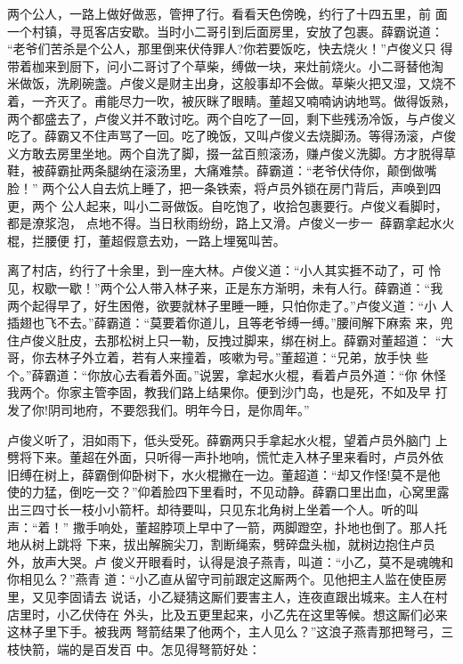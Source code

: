 两个公人，一路上做好做恶，管押了行。看看天色傍晚，约行了十四五里，前
面一个村镇，寻觅客店安歇。当时小二哥引到后面房里，安放了包裹。薛霸说道：
“老爷们苦杀是个公人，那里倒来伏侍罪人?你若要饭吃，快去烧火！”卢俊义只
得带着枷来到厨下，问小二哥讨了个草柴，缚做一块，来灶前烧火。小二哥替他淘
米做饭，洗刷碗盏。卢俊义是财主出身，这般事却不会做。草柴火把又湿，又烧不
着，一齐灭了。甫能尽力一吹，被灰眯了眼睛。董超又喃喃讷讷地骂。做得饭熟，
两个都盛去了，卢俊义并不敢讨吃。两个自吃了一回，剩下些残汤冷饭，与卢俊义
吃了。薛霸又不住声骂了一回。吃了晚饭，又叫卢俊义去烧脚汤。等得汤滚，卢俊
义方敢去房里坐地。两个自洗了脚，掇一盆百煎滚汤，赚卢俊义洗脚。方才脱得草
鞋，被薛霸扯两条腿纳在滚汤里，大痛难禁。薛霸道：“老爷伏侍你，颠倒做嘴脸！”
两个公人自去炕上睡了，把一条铁索，将卢员外锁在房门背后，声唤到四更，两个
公人起来，叫小二哥做饭。自吃饱了，收拾包裹要行。卢俊义看脚时，都是潦浆泡，
点地不得。当日秋雨纷纷，路上又滑。卢俊义一步一，薛霸拿起水火棍，拦腰便
打，董超假意去劝，一路上埋冤叫苦。

离了村店，约行了十余里，到一座大林。卢俊义道：“小人其实捱不动了，可
怜见，权歇一歇！”两个公人带入林子来，正是东方渐明，未有人行。薛霸道：“我
两个起得早了，好生困倦，欲要就林子里睡一睡，只怕你走了。”卢俊义道：“小
人插翅也飞不去。”薛霸道：“莫要着你道儿，且等老爷缚一缚。”腰间解下麻索
来，兜住卢俊义肚皮，去那松树上只一勒，反拽过脚来，绑在树上。薛霸对董超道：
“大哥，你去林子外立着，若有人来撞着，咳嗽为号。”董超道：“兄弟，放手快
些个。”薛霸道：“你放心去看着外面。”说罢，拿起水火棍，看着卢员外道：“你
休怪我两个。你家主管李固，教我们路上结果你。便到沙门岛，也是死，不如及早
打发了你!阴司地府，不要怨我们。明年今日，是你周年。”

卢俊义听了，泪如雨下，低头受死。薛霸两只手拿起水火棍，望着卢员外脑门
上劈将下来。董超在外面，只听得一声扑地响，慌忙走入林子里来看时，卢员外依
旧缚在树上，薛霸倒仰卧树下，水火棍撇在一边。董超道：“却又作怪!莫不是他
使的力猛，倒吃一交？”仰着脸四下里看时，不见动静。薛霸口里出血，心窝里露
出三四寸长一枝小小箭杆。却待要叫，只见东北角树上坐着一个人。听的叫声：“着！”
撒手响处，董超脖项上早中了一箭，两脚蹬空，扑地也倒了。那人托地从树上跳将
下来，拔出解腕尖刀，割断绳索，劈碎盘头枷，就树边抱住卢员外，放声大哭。卢
俊义开眼看时，认得是浪子燕青，叫道：“小乙，莫不是魂魄和你相见么？”燕青
道：“小乙直从留守司前跟定这厮两个。见他把主人监在使臣房里，又见李固请去
说话，小乙疑猜这厮们要害主人，连夜直跟出城来。主人在村店里时，小乙伏侍在
外头，比及五更里起来，小乙先在这里等候。想这厮们必来这林子里下手。被我两
弩箭结果了他两个，主人见么？”这浪子燕青那把弩弓，三枝快箭，端的是百发百
中。怎见得弩箭好处：

